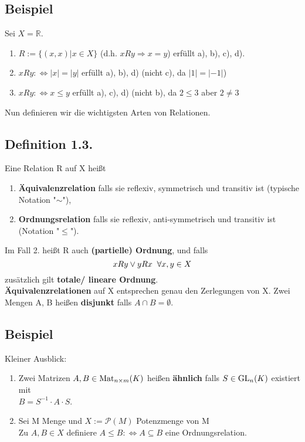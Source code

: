 \documentclass[a4paper,twoside]{article}
\newcommand{\tn}[1]{\textnormal {#1}}
\begin{document}
\subsection*{Beispiel} 
Sei $X = \mathbb R$.
\begin{enumerate}[label=(\alph*)]
\item $ R:=\{(x,x) | x\in X\}$ (d.h. $xRy \Rightarrow x=y$) erfüllt a), b), c), d).
\item $ xRy :\Leftrightarrow |x|=|y|$ erfüllt a), b), d) (nicht c), da $|1|=|-1|$)
\item $ xRy :\Leftrightarrow x\leq y$ erfüllt a), c), d) (nicht b), da $2\leq 3$ aber $2 \neq 3$
\end{enumerate}
Nun definieren wir die wichtigsten Arten von Relationen.

\subsection*{Definition 1.3.}
Eine Relation R auf X heißt
\begin{enumerate}[label=(\arabic*)]
\item \textbf{Äquivalenzrelation} falls sie reflexiv, symmetrisch und transitiv ist (typische Notation "$\sim$"),
\item \textbf{Ordnungsrelation} falls sie reflexiv, anti-symmetrisch und transitiv ist (Notation "$\leq$").
\end{enumerate}
Im Fall 2. heißt R auch \textbf{(partielle) Ordnung}, und falls 
$$ xRy \lor yRx \hspace*{2mm} \forall x,y \in X$$
zusätzlich gilt \textbf{totale/ lineare Ordnung}.\\
\textbf{Äquivalenzrelationen} auf X entsprechen genau den Zerlegungen von X.
Zwei Mengen A, B heißen \textbf{disjunkt} falls $A \cap B = \emptyset$.

\subsection*{Beispiel}
Kleiner Ausblick:
\begin{enumerate}[label=(\alph*)]
\item Zwei Matrizen $A,B \in \tn{Mat}_{n{\times}m}(K)$ heißen \textbf{ähnlich} falls $S \in \tn{GL}_n(K)$ existiert mit \\$B=S^{-1}{\cdot}A{\cdot}S$.
\item Sei M Menge und $X:=\mathcal P(M)$ Potenzmenge von M\\
 Zu $A,B \in X$ definiere $A\leq B :\Leftrightarrow A\subseteq B$ eine Ordnungsrelation.
\end{enumerate}
\end{document}
